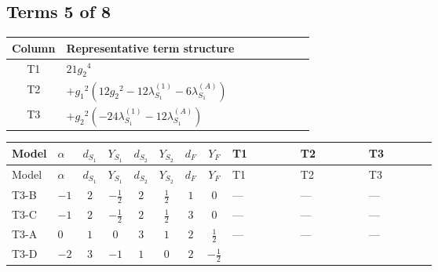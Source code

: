\documentclass[8pt]{article}
\begin{document}
\begin{landscape}
\subsection*{Terms 5 of 8}
\begin{center}
\begin{tabular}{@{}c >{\raggedright\arraybackslash}p{0.82\linewidth}@{}}
\toprule
Column & Representative term structure \\
\midrule
T1 & \(\displaystyle 21 {g_2}^4\) \\
\midrule
T2 & \(\displaystyle +{g_1}^2 \left(12 {g_2}^2-12 {\lambda_{S_1}^{(1)}}-6 {\lambda_{S_1}^{(A)}}\right)\) \\
\midrule
T3 & \(\displaystyle +{g_2}^2 (-24 {\lambda_{S_1}^{(1)}}-12 {\lambda_{S_1}^{(A)}})\) \\
\midrule
\bottomrule
\end{tabular}
\end{center}
\smallskip
\tiny
\begin{longtable}{@{}llcccccc >{\raggedright\arraybackslash}p{0.21\linewidth} >{\raggedright\arraybackslash}p{0.21\linewidth} >{\raggedright\arraybackslash}p{0.21\linewidth}@{}}
\toprule
Model & $\alpha$ & $d_{S_1}$ & $Y_{S_1}$ & $d_{S_2}$ & $Y_{S_2}$ & $d_F$ & $Y_F$ & T1 & T2 & T3 \\
\midrule
\endfirsthead
\toprule
Model & $\alpha$ & $d_{S_1}$ & $Y_{S_1}$ & $d_{S_2}$ & $Y_{S_2}$ & $d_F$ & $Y_F$ & T1 & T2 & T3 \\
\midrule
\endhead
T3-B & $-1$ & $2$ & $-\frac{1}{2}$ & $2$ & $\frac{1}{2}$ & $1$ & $0$ & --- & --- & --- \\
\midrule
T3-C & $-1$ & $2$ & $-\frac{1}{2}$ & $2$ & $\frac{1}{2}$ & $3$ & $0$ & --- & --- & --- \\
\midrule
T3-A & $0$ & $1$ & $0$ & $3$ & $1$ & $2$ & $\frac{1}{2}$ & --- & --- & --- \\
\midrule
T3-D & $-2$ & $3$ & $-1$ & $1$ & $0$ & $2$ & $-\frac{1}{2}$ & \scriptsize\adjustbox{max width=\linewidth}{$\begin{gathered} 21 {g_2}^4\end{gathered}$} & \scriptsize\adjustbox{max width=\linewidth}{$\begin{gathered} +{g_1}^2 \left(12 {g_2}^2-12 {\lambda_{S_1}^{(1)}}-6 {\lambda_{S_1}^{(A)}}\right)\end{gathered}$} & \scriptsize\adjustbox{max width=\linewidth}{$\begin{gathered} +{g_2}^2 (-24 {\lambda_{S_1}^{(1)}}-12 {\lambda_{S_1}^{(A)}})\end{gathered}$} \\

\end{longtable}
\end{landscape}
\end{document}
